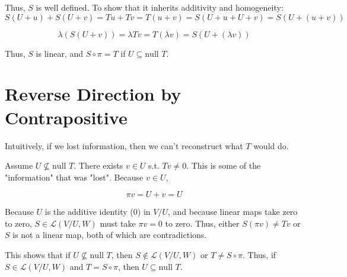 \documentclass[letterpaper]{article}
\begin{document}
Thus, \(S\) is well defined. To show that it inherits additivity and homogeneity:
\[ S(U+u) + S(U+v) = Tu + Tv = T(u+v) = S(U+u + U+v) = S(U+(u+v)) \]

\[ \lambda\left(S(U+v)\right) = \lambda Tv = T(\lambda v) = S(U+(\lambda v)) \]

Thus, \(S\) is linear, and \(S \circ \pi = T\) if \(U \subseteq \text{null }T\).

\section{Reverse Direction by Contrapositive}
\label{sec:org9528191}
Intuitively, if we lost information, then we can't reconstruct what \(T\) would do.

Assume \(U \nsubseteq \text{null }T\). There exists \(v \in U\) s.t. \(Tv \neq 0\). This is some of the "information" that was "lost". Because \(v \in U\),

\[ \pi v = U + v = U \]

Because \(U\) is the additive identity (\(0\)) in \(V/U\), and because linear maps take zero to zero, \(S \in \mathcal L(V/U, W)\) must take \(\pi v = 0\) to zero.
Thus, either \(S(\pi v) \neq Tv\) or \(S\) is not a linear map, both of which are contradictions.

This shows that if \(U \nsubseteq \text{null }T\), then \(S \notin \mathcal L(V/U, W)\) or \(T \neq S \circ \pi\). Thus, if \(S \in \mathcal L(V/U, W)\) and \(T = S \circ \pi\), then \(U \subseteq \text{null }T\).
\end{document}
